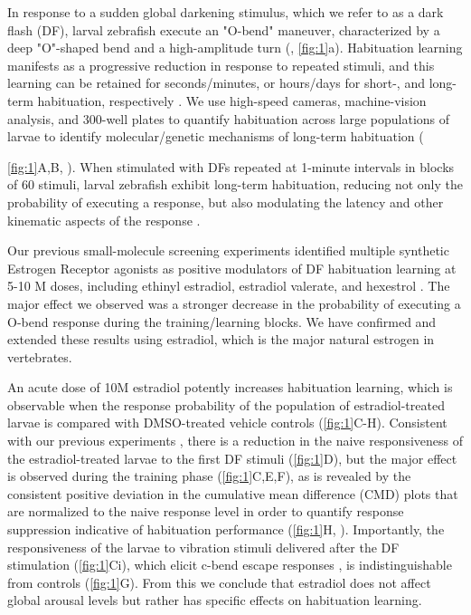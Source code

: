 \documentclass[9.5pt,lineno]{RandlettLab_elife}
\begin{document}
\begin{figure}
\begin{fullwidth}
\begin{center}
\label{fig:1}

\end{center}
\end{fullwidth}
\end{figure}

In response to a sudden global darkening stimulus, which we refer to as a dark flash (DF), larval zebrafish execute an "O-bend" maneuver, characterized by a deep "O"-shaped bend and a high-amplitude turn (\citealp{Burgess2007}, \autoref{fig:1}a). 
Habituation learning manifests as a progressive reduction in response to repeated stimuli, and this learning can be retained for seconds/minutes, or hours/days for short-, and long-term habituation, respectively \citep{Rankin2009-no}. 
We use high-speed cameras, machine-vision analysis, and 300-well plates to quantify habituation across large populations of larvae to identify molecular/genetic mechanisms of long-term habituation ({\autoref{fig:1}A,B, \citealp{Randlett2019-fj,Lamire2023-he}). 
When stimulated with DFs repeated at 1-minute intervals in blocks of 60 stimuli, larval zebrafish exhibit long-term habituation, reducing not only the probability of executing a response, but also modulating the latency and other kinematic aspects of the response \citep{Randlett2019-fj}.  


Our previous small-molecule screening experiments identified multiple synthetic Estrogen Receptor agonists as positive modulators of DF habituation learning at 5-10 \textmu M doses, including ethinyl estradiol, estradiol valerate, and hexestrol  \citep{Lamire2023-he}. 
The major effect we observed was a stronger decrease in the probability of executing a O-bend response during the training/learning blocks. 
We have confirmed and extended these results using estradiol, which is the major natural estrogen in vertebrates. 

An acute dose of 10\textmu M estradiol potently increases habituation learning, which is observable when the response probability of the population of estradiol-treated larvae is compared with DMSO-treated vehicle controls (\autoref{fig:1}C-H).
Consistent with our previous experiments \citep{Lamire2023-he}, there is a reduction in the naive responsiveness of the estradiol-treated larvae to the first DF stimuli (\autoref{fig:1}D), but the major effect is observed during the training phase (\autoref{fig:1}C,E,F), as is revealed by the consistent positive deviation in the cumulative mean difference (CMD) plots that are normalized to the naive response level in order to quantify response suppression indicative of habituation performance (\autoref{fig:1}H, \citealp{Randlett2019-fj}).
Importantly, the responsiveness of the larvae to vibration stimuli delivered after the DF stimulation (\autoref{fig:1}Ci), which elicit c-bend escape responses \citep{Kimmel1974-jh}, is indistinguishable from controls (\autoref{fig:1}G). From this we conclude that estradiol does not affect global arousal levels but rather has specific effects on habituation learning. 

}
\end{document}

